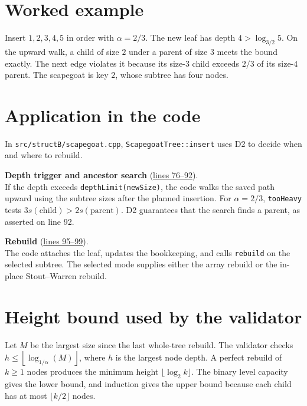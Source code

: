 \documentclass[11pt,a4paper]{article}
\newcommand{\limitheight}[1]{\left\lfloor\log_{1/\alpha}(#1)\right\rfloor}
\begin{document}
\section{Worked example}

Insert \(1,2,3,4,5\) in order with \(\alpha=2/3\). The new leaf
has depth \(4>\log_{3/2}5\). On the upward walk, a child of size \(2\)
under a parent of size \(3\) meets the bound exactly. The next edge
violates it because its size-\(3\) child exceeds \(2/3\) of its size-\(4\)
parent. The scapegoat is key \(2\), whose subtree has four nodes.

\newpage

\section{Application in the code}

In \texttt{src/structB/scapegoat.cpp},
\texttt{ScapegoatTree::insert} uses D2 to decide when and where to rebuild.

\textbf{Depth trigger and ancestor search}
(\href{https://github.com/godofwar1007/DSA-project/blob/9e56fbb/src/structB/scapegoat.cpp#L76-L92}{lines 76--92}).\\
If the depth exceeds \texttt{depthLimit(newSize)}, the code walks the
saved path upward using the subtree sizes after the planned insertion.
For \(\alpha=2/3\), \texttt{tooHeavy} tests
\(3s(\mathrm{child})>2s(\mathrm{parent})\). D2 guarantees that the
search finds a parent, as asserted on line 92.

\textbf{Rebuild}
(\href{https://github.com/godofwar1007/DSA-project/blob/9e56fbb/src/structB/scapegoat.cpp#L95-L99}{lines 95--99}).\\
The code attaches the leaf, updates the bookkeeping, and calls
\texttt{rebuild} on the selected subtree. The selected mode supplies
either the array rebuild or the in-place Stout--Warren rebuild.

\section{Height bound used by the validator}

Let \(M\) be the largest size since the last whole-tree rebuild.
The validator checks \(h\leq\limitheight{M}\), where \(h\) is the largest
node depth. A perfect rebuild of \(k\geq1\) nodes produces the minimum
height \(\lfloor\log_2 k\rfloor\). The binary level capacity gives the
lower bound, and induction gives the upper bound because each child
has at most \(\lfloor k/2\rfloor\) nodes.
\end{document}
